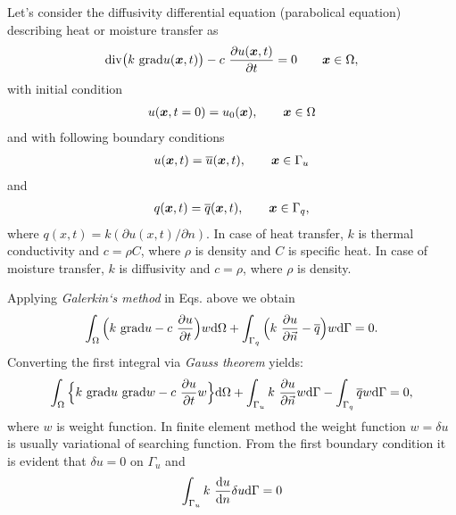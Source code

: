 Let's consider the diffusivity differential equation (parabolical equation) describing heat or moisture transfer as 
\begin{eqnarray}
{\rm div} \big(k\ {\rm grad} u(\tenss{x},t) \big) -  c\ \frac{\partial  u(\tenss{x},t)}{\partial t} = 0 \qquad \tenss{x} 
\in \Omega,\nonumber
\end{eqnarray}
with initial condition
\begin{eqnarray}
u(\mbox{\boldmath$x$},t = 0) = u_0(\mbox{\boldmath$x$}), \qquad \mbox{\boldmath$x$} \in \Omega \nonumber
\end{eqnarray}
and with following boundary conditions
\begin{eqnarray}
u(\mbox{\boldmath$x$},t) = \overline{u}(\mbox{\boldmath$x$},t), \qquad \mbox{\boldmath$x$} \in \Gamma_u \nonumber
\end{eqnarray}
and
\begin{eqnarray}
q(\mbox{\boldmath$x$},t) = \overline{q}(\mbox{\boldmath$x$},t), \qquad \mbox{\boldmath$x$} \in \Gamma_q, \nonumber
\end{eqnarray}
where $q(x,t) = k (\partial  u(x,t) / \partial n)$.
In case of heat transfer, $k$ is thermal conductivity and $c = \rho  C$, where $\rho$ is density and $C$ is specific heat.
In case of moisture transfer, $k$ is diffusivity and $c = \rho$, where $\rho$ is density.

Applying {\it Galerkin`s method} in Eqs. above we obtain
\begin{eqnarray}
\int_{\Omega}\Big(k\ {\rm grad} u - c\ \frac{\partial u}{\partial t}\Big) w {\rm d} \Omega + 
\int_{\Gamma_q}\Big(k\ \frac{\partial u}{\partial \vec{n}} - \overline{q}\Big)w {\rm d} \Gamma = 0.
\end{eqnarray}
Converting the first integral via {\it Gauss theorem} yields:
\begin{eqnarray}\label{nfem}
\int_{\Omega}\Big\{ k\ {\rm grad} u \ {\rm grad} w - c\  \frac{\partial u}{\partial t} w \Big\} {\rm d}\Omega
+ \int_{\Gamma_u} k\ \frac{\partial u}{\partial \vec{n}} w {\rm d}\Gamma - \int_{\Gamma_q} 
\overline{q} w {\rm d}\Gamma = 0,
\end{eqnarray}
where $w$ is weight function. In finite element method the weight function $w = \delta u$ is 
usually  variational of searching function.
From the first boundary condition it is evident that $\delta u = 0$ on $\Gamma_u$ and 
\begin{eqnarray}
\int_{\Gamma_u} k\ \frac{{\rm d} u}{{\rm d} n} \delta u {\rm d}\Gamma = 0
\end{eqnarray}

